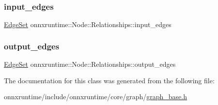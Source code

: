 \mbox{\label{classonnxruntime_1_1Node_1_1Relationships_af2b0f5c2d3c071d99cd5120a717699b8}} 
\subsubsection{\texorpdfstring{input\+\_\+edges}{input\_edges}}
{\footnotesize\ttfamily \mbox{\hyperlink{classonnxruntime_1_1Node_a21f67a4ba50eb4c6dea0c37982b48da8}{Edge\+Set}} onnxruntime\+::\+Node\+::\+Relationships\+::input\+\_\+edges}

\mbox{\label{classonnxruntime_1_1Node_1_1Relationships_afc504014c91de4ad25fecdd21c1d6a47}} 
\subsubsection{\texorpdfstring{output\+\_\+edges}{output\_edges}}
{\footnotesize\ttfamily \mbox{\hyperlink{classonnxruntime_1_1Node_a21f67a4ba50eb4c6dea0c37982b48da8}{Edge\+Set}} onnxruntime\+::\+Node\+::\+Relationships\+::output\+\_\+edges}



The documentation for this class was generated from the following file\+:\begin{DoxyCompactItemize}
\item 
onnxruntime/include/onnxruntime/core/graph/\mbox{\hyperlink{graph__base_8h}{graph\+\_\+base.\+h}}\end{DoxyCompactItemize}
